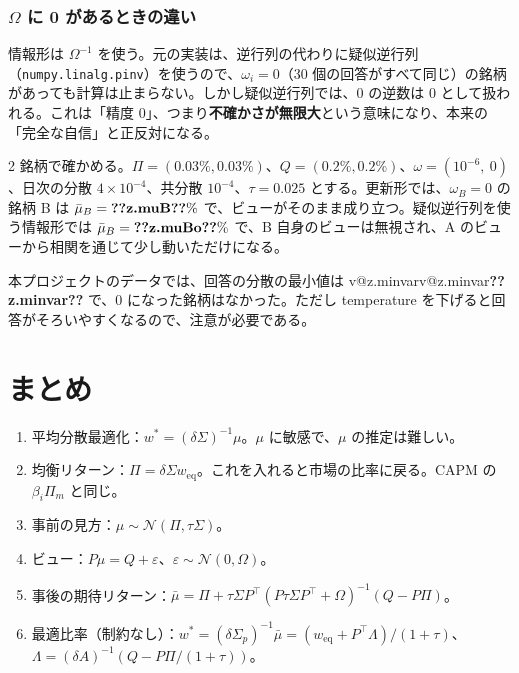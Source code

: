 \documentclass[xelatex,ja=standard,jafont=hiragino-pron,a4paper,11pt,openany]{bxjsreport}
\makeatletter
\newcommand{\V}[1]{\ifcsname v@#1\endcsname\csname v@#1\endcsname\else\textbf{??#1??}\fi}
\newcommand{\code}[1]{\texttt{#1}}
\newcommand{\T}{^{\top}}
\newcommand{\weq}{w_{\mathrm{eq}}}
\newcommand{\mub}{\bar{\mu}}
\newcommand{\Sp}{\Sigma_{p}}
\makeatother
\begin{document}
\subsection{$\Omega$ に 0 があるときの違い}\label{sec:pinv}

情報形は $\Omega^{-1}$ を使う。元の実装は、逆行列の代わりに疑似逆行列（\code{numpy.linalg.pinv}）を使うので、$\omega_i = 0$（30 個の回答がすべて同じ）の銘柄があっても計算は止まらない。しかし疑似逆行列では、0 の逆数は 0 として扱われる。これは「精度 0」、つまり\textbf{不確かさが無限大}という意味になり、本来の「完全な自信」と正反対になる。

2 銘柄で確かめる。$\Pi = (0.03\%, 0.03\%)$、$Q = (0.2\%, 0.2\%)$、$\omega = (10^{-6},\ 0)$、日次の分散 $4 \times 10^{-4}$、共分散 $10^{-4}$、$\tau = 0.025$ とする。更新形では、$\omega_B = 0$ の銘柄 B は $\mub_B = \V{z.muB}\%$ で、ビューがそのまま成り立つ。疑似逆行列を使う情報形では $\mub_B = \V{z.muBo}\%$ で、B 自身のビューは無視され、A のビューから相関を通じて少し動いただけになる。

本プロジェクトのデータでは、回答の分散の最小値は \V{z.minvar} で、0 になった銘柄はなかった。ただし temperature を下げると回答がそろいやすくなるので、注意が必要である。

\chapter{まとめ}\label{ch:summary}

\begin{keybox}[式の流れ]
\begin{enumerate}
\item 平均分散最適化：$w^* = (\delta\Sigma)^{-1}\mu$。$\mu$ に敏感で、$\mu$ の推定は難しい。
\item 均衡リターン：$\Pi = \delta\Sigma\weq$。これを入れると市場の比率に戻る。CAPM の $\beta_i\Pi_m$ と同じ。
\item 事前の見方：$\mu \sim \mathcal{N}(\Pi, \tau\Sigma)$。
\item ビュー：$P\mu = Q + \varepsilon$、$\varepsilon \sim \mathcal{N}(0, \Omega)$。
\item 事後の期待リターン：$\mub = \Pi + \tau\Sigma P\T(P\tau\Sigma P\T + \Omega)^{-1}(Q - P\Pi)$。
\item 最適比率（制約なし）：$w^* = (\delta\Sp)^{-1}\mub = (\weq + P\T\Lambda)/(1 + \tau)$、$\Lambda = (\delta A)^{-1}(Q - P\Pi/(1 + \tau))$。
\end{enumerate}
\end{keybox}
\end{document}
